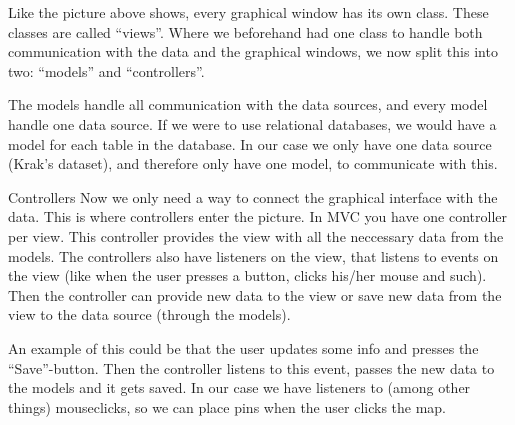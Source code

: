 Like the picture above shows, every graphical window has its own class. These
classes are called ``views''. Where we beforehand had one class to handle both
communication with the data and the graphical windows, we now split this into
two: ``models'' and ``controllers''.

The models handle all communication with the data sources, and every model
handle one data source. If we were to use relational databases, we would have a
model for each table in the database. In our case we only have one data source
(Krak's dataset), and therefore only have one model, to communicate with this.

Controllers
Now we only need a way to connect the graphical interface with the data. This is
where controllers enter the picture. In MVC you have one controller per view.
This controller provides the view with all the neccessary data from the models.
The controllers also have listeners on the view, that listens to events on the
view (like when the user presses a button, clicks his/her mouse and such). Then
the controller can provide new data to the view or save new data from the view
to the data source (through the models).

An example of this could be that the user updates some info and presses the 
``Save''-button. Then the controller listens to this event, passes the new data
to the models and it gets saved.
In our case we have listeners to (among other things) mouseclicks, so we can
place pins when the user clicks the map.